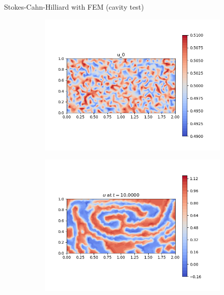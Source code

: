 \begin{frame}{Stokes-Cahn-Hilliard with FEM {\small(cavity test)}}
	\vspace{-0.3cm}
	\begin{figure}[t]
		\begin{subfigure}{0.49\textwidth}
			\centering
			\includegraphics[scale=0.28]{img/stokes-cahn-hilliard/u_stokes_initial_condition.png}
		\end{subfigure}
		\hspace*{-1.5cm}
		\begin{subfigure}{0.49\textwidth}
			\centering
			\includegraphics[scale=0.28]{img/stokes-cahn-hilliard/u_FE+Eyre_stokes_nt-40000_t-10.00000_P1.png}
		\end{subfigure}

\end{figure}
\end{frame}
